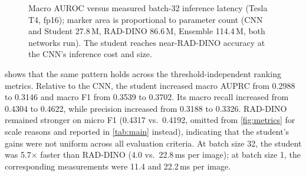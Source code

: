 \documentclass[conference]{IEEEtran}
\begin{document}
\begin{figure}[t]
\centering
{}
\caption{Macro AUROC versus measured batch-32 inference latency (Tesla T4, fp16); marker area is proportional to parameter count (CNN and Student 27.8\,M, RAD-DINO 86.6\,M, Ensemble 114.4\,M, both networks run). The student reaches near-RAD-DINO accuracy at the CNN's inference cost and size.}
\label{fig:latency}
\end{figure}

 shows that the same pattern holds across the threshold-independent ranking metrics. Relative to the CNN, the student increased macro AUPRC from 0.2988 to 0.3146 and macro F1 from 0.3539 to 0.3702. Its macro recall increased from 0.4304 to 0.4622, while precision increased from 0.3188 to 0.3326. RAD-DINO remained stronger on micro F1 (0.4317 vs.\ 0.4192, omitted from \cref{fig:metrics} for scale reasons and reported in \cref{tab:main} instead), indicating that the student's gains were not uniform across all evaluation criteria. At batch size 32, the student was 5.7$\times$ faster than RAD-DINO (4.0 vs.\ 22.8\,ms per image); at batch size 1, the corresponding measurements were 11.4 and 22.2\,ms per image.
\end{document}
